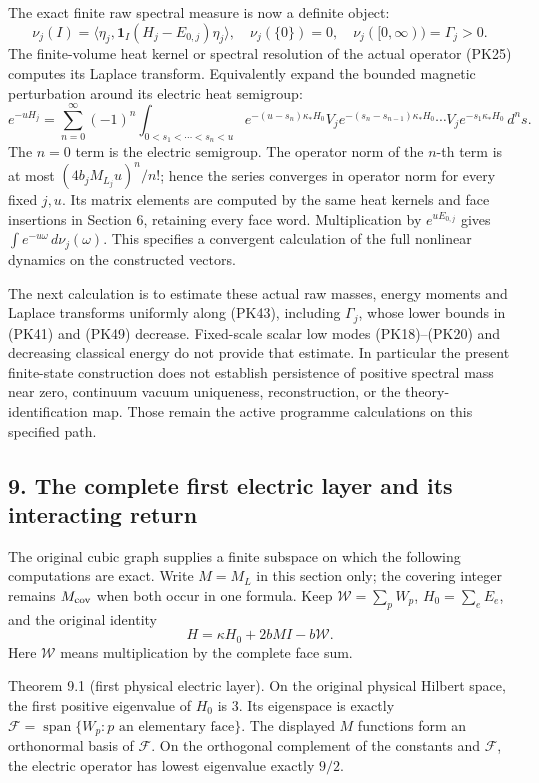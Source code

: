 \documentclass[11pt]{article}
\begin{document}
The exact finite raw spectral measure is now a definite object:
\[
 \nu_j(I)=\langle\eta_j,\mathbf1_I(H_j-E_{0,j})\eta_j\rangle,
 \quad \nu_j(\{0\})=0,\quad \nu_j([0,\infty))=\Gamma_j>0.
 \tag{PK44}
\]
The finite-volume heat kernel or spectral resolution of the actual
operator (PK25) computes its Laplace transform. Equivalently expand the
bounded magnetic perturbation around its electric heat semigroup:
\[
 e^{-uH_j}=\sum_{n=0}^{\infty}(-1)^n
 \int_{0<s_1<\cdots<s_n<u}
 e^{-(u-s_n)\kappa_*H_0}V_j e^{-(s_n-s_{n-1})\kappa_*H_0}
 \cdots V_j e^{-s_1\kappa_*H_0}\,d^ns.
 \tag{PK45}
\]
The \(n=0\) term is the electric semigroup. The operator norm of the
\(n\)-th term is at most \((4b_jM_{L_j}u)^n/n!\); hence the series
converges in operator norm for every fixed \(j,u\). Its matrix elements
are computed by the same heat kernels and face insertions in Section 6,
retaining every face word. Multiplication by \(e^{uE_{0,j}}\) gives
\(\int e^{-u\omega}\,d\nu_j(\omega)\). This specifies a convergent
calculation of the full nonlinear dynamics on the constructed vectors.

The next calculation is to estimate these actual raw masses, energy
moments and Laplace transforms uniformly along (PK43), including
\(\Gamma_j\), whose lower bounds in (PK41) and (PK49) decrease. Fixed-scale
scalar low modes (PK18)–(PK20) and decreasing classical energy do not
provide that estimate. In particular the present finite-state construction
does not establish persistence of positive spectral mass near zero,
continuum vacuum uniqueness, reconstruction, or the theory-identification
map. Those remain the active programme calculations on this specified path.

\subsection*{9. The complete first electric layer and its interacting return}

The original cubic graph supplies a finite subspace on which the following
computations are exact. Write \(M=M_L\) in this section only; the covering
integer remains \(M_{\rm cov}\) when both occur in one formula. Keep
\(\mathcal W=\sum_pW_p\), \(H_0=\sum_eE_e\), and the original identity
\[
 H=\kappa H_0+2bM I-b\mathcal W.
 \tag{PK46}
\]
Here \(\mathcal W\) means multiplication by the complete face sum.

Theorem 9.1 (first physical electric layer). On the original physical
Hilbert space, the first positive eigenvalue of \(H_0\) is \(3\). Its
eigenspace is exactly
\(\mathcal F=\operatorname{span}\{W_p:p\text{ an elementary face}\}\).
The displayed \(M\) functions form an orthonormal basis of \(\mathcal F\).
On the orthogonal complement of the constants and \(\mathcal F\), the
electric operator has lowest eigenvalue exactly \(9/2\).
\end{document}
